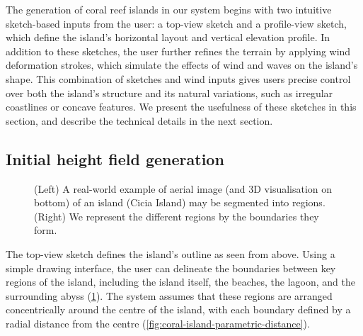 
The generation of coral reef islands in our system begins with two intuitive sketch-based inputs from the user: a top-view sketch and a profile-view sketch, which define the island's horizontal layout and vertical elevation profile. In addition to these sketches, the user further refines the terrain by applying wind deformation strokes, which simulate the effects of wind and waves on the island's shape. This combination of sketches and wind inputs gives users precise control over both the island's structure and its natural variations, such as irregular coastlines or concave features. We present the usefulness of these sketches in this section, and describe the technical details in the next section.

\subsection{Initial height field generation}
\label{sec:coral-island-generation-initial}

\begin{figure}[H]
    \caption{(Left) A real-world example of aerial image (and 3D visualisation on bottom) of an island (Cicia Island) may be segmented into regions. (Right) We represent the different regions by the boundaries they form.}
    \label{fig:coral-island-top-view-sketch}
\end{figure}

The top-view sketch defines the island's outline as seen from above. Using a simple drawing interface, the user can delineate the boundaries between key regions of the island, including the island itself, the beaches, the lagoon, and the surrounding abyss (\cref{fig:coral-island-top-view-sketch}). The system assumes that these regions are arranged concentrically around the centre of the island, with each boundary defined by a radial distance from the centre (\cref{fig:coral-island-parametric-distance}).


